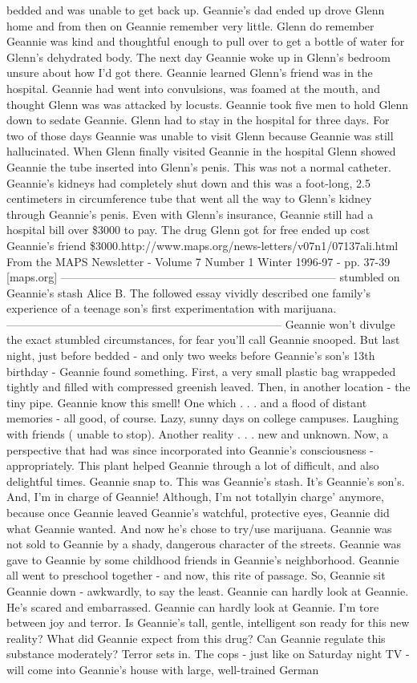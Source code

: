 \documentclass[12pt]{book}
\begin{document}
bedded and was unable to get back up. Geannie's dad ended up drove Glenn home and from then on Geannie remember very little. Glenn do remember Geannie was kind and thoughtful enough to pull over to get a bottle of water for Glenn's dehydrated body. The next day Geannie woke up in Glenn's bedroom unsure about how I'd got there. Geannie learned Glenn's friend was in the hospital. Geannie had went into convulsions, was foamed at the mouth, and thought Glenn was was attacked by locusts. Geannie took five men to hold Glenn down to sedate Geannie. Glenn had to stay in the hospital for three days. For two of those days Geannie was unable to visit Glenn because Geannie was still hallucinated. When Glenn finally visited Geannie in the hospital Glenn showed Geannie the tube inserted into Glenn's penis. This was not a normal catheter. Geannie's kidneys had completely shut down and this was a foot-long, 2.5 centimeters in circumference tube that went all the way to Glenn's kidney through Geannie's penis. Even with Glenn's insurance, Geannie still had a hospital bill over \$3000 to pay. The drug Glenn got for free ended up cost Geannie's friend \$3000.http://www.maps.org/news-letters/v07n1/07137ali.html From the MAPS Newsletter - Volume 7 Number 1 Winter 1996-97 - pp. 37-39 [maps.org] -------------------------------------------------------------------------- stumbled on Geannie's stash Alice B. The followed essay vividly described one family's experience of a teenage son's first experimentation with marijuana. -------------------------------------------------------------------------- Geannie won't divulge the exact stumbled circumstances, for fear you'll call Geannie snooped. But last night, just before bedded - and only two weeks before Geannie's son's 13th birthday - Geannie found something. First, a very small plastic bag wrappeded tightly and filled with compressed greenish leaved. Then, in another location - the tiny pipe. Geannie know this smell! One which . . .  and a flood of distant memories - all good, of course. Lazy, sunny days on college campuses. Laughing with friends ( unable to stop). Another reality . . .  new and unknown. Now, a perspective that had was since incorporated into Geannie's consciousness - appropriately. This plant helped Geannie through a lot of difficult, and also delightful times. Geannie snap to. This was Geannie's stash. It's Geannie's son's. And, I'm in charge of Geannie! Although, I'm not totallyin charge' anymore, because once Geannie leaved Geannie's watchful, protective eyes, Geannie did what Geannie wanted. And now he's chose to try/use marijuana. Geannie was not sold to Geannie by a shady, dangerous character of the streets. Geannie was gave to Geannie by some childhood friends in Geannie's neighborhood. Geannie all went to preschool together - and now, this rite of passage. So, Geannie sit Geannie down - awkwardly, to say the least. Geannie can hardly look at Geannie. He's scared and embarrassed. Geannie can hardly look at Geannie. I'm tore between joy and terror. Is Geannie's tall, gentle, intelligent son ready for this new reality? What did Geannie expect from this drug? Can Geannie regulate this substance moderately? Terror sets in. The cops - just like on Saturday night TV - will come into Geannie's house with large, well-trained German 
\end{document}
